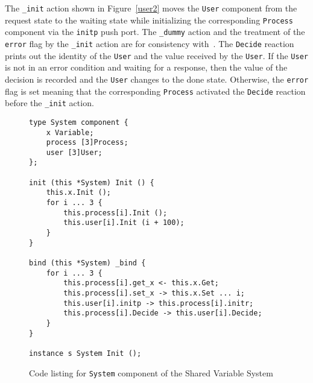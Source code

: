 The \verb+_init+ action shown in Figure~\ref{user2} moves the \verb+User+ component from the request state to the waiting state while initializing the corresponding \verb+Process+ component via the \verb+initp+ push port.
The \verb+_dummy+ action and the treatment of the \verb+error+ flag by the \verb+_init+ action are for consistency with~\cite{nancy1996distributed}.
The \verb+Decide+ reaction prints out the identity of the \verb+User+ and the value received by the \verb+User+.
If the \verb+User+ is not in an error condition and waiting for a response, then the value of the decision is recorded and the \verb+User+ changes to the done state.
Otherwise, the \verb+error+ flag is set meaning that the corresponding \verb+Process+ activated the \verb+Decide+ reaction before the \verb+_init+ action.

\clearpage

\begin{figure}
\begin{verbatim}
type System component {
    x Variable;
    process [3]Process;
    user [3]User;
};

init (this *System) Init () {
    this.x.Init ();
    for i ... 3 {
        this.process[i].Init ();
        this.user[i].Init (i + 100);
    }
}

bind (this *System) _bind {
    for i ... 3 {
        this.process[i].get_x <- this.x.Get;
        this.process[i].set_x -> this.x.Set ... i;
        this.user[i].initp -> this.process[i].initr;
        this.process[i].Decide -> this.user[i].Decide;
    }
}

instance s System Init ();
\end{verbatim}
\cprotect\caption{Code listing for \verb+System+ component of the Shared Variable System}
\label{system}
\end{figure}

